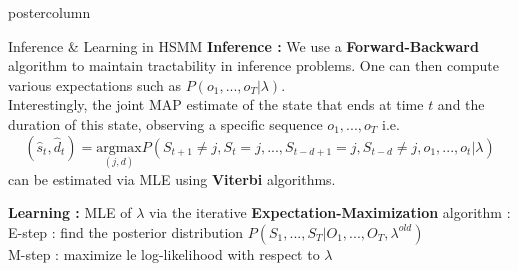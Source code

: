 \documentclass[final,hyperref={pdfpagelabels=false}]{beamer}
\newlength{\columnheight}
\begin{document}
\begin{frame}
\begin{columns}
    \begin{column}{.50\textwidth}
      \begin{beamercolorbox}[center,wd=\textwidth]{postercolumn}
        \begin{minipage}[T]{.98\textwidth} %
          \parbox[t][\columnheight]{\textwidth}{ %
            \begin{block}{Inference \& Learning in HSMM}
                \textbf{Inference :}
                \vskip0.5cm
                We use a \textbf{Forward-Backward} algorithm to maintain tractability in inference problems.
                One can then compute various expectations such as $P(o_1, ..., o_T | \lambda)$.\\
                Interestingly, the joint MAP estimate of the state that ends at time $t$ and the duration of this state,
                observing a specific sequence $o_1, ..., o_T$ i.e.
                {\small $$(\hat s_t, \hat d_t) = \underset{(j,d)}{\mathrm{arg max}} P(S_{t+1} \neq j, S_t = j, ..., S_{t-d+1} = j, S_{t-d} \neq j, o_1, ..., o_t | \lambda)$$}
                can be estimated via MLE using \textbf{Viterbi} algorithms.

                \vskip1cm
                \textbf{Learning :}
                \vskip0.5cm
                MLE of $\lambda$ via the iterative \textbf{Expectation-Maximization} algorithm :\\
                E-step : find the posterior distribution {\small $P(S_1, ..., S_T | O_1, ..., O_T, \lambda^{old})$}\\
                M-step : maximize le log-likelihood with respect to $\lambda$
            \end{block}

}
\end{minipage}
\end{beamercolorbox}
\end{column}
\end{columns}
\end{frame}
\end{document}
